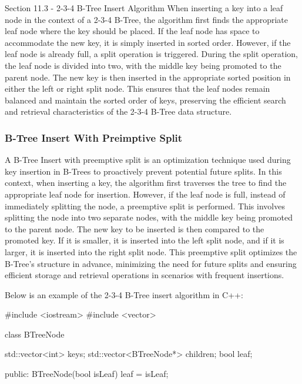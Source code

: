 \begin{notes}{Section 11.3 - 2-3-4 B-Tree Insert Algorithm}
    When inserting a key into a leaf node in the context of a 2-3-4 B-Tree, the algorithm first finds the appropriate leaf node where the key should be placed. If the leaf node has space to accommodate the new key, it is simply inserted in sorted order. However, if the leaf node is already full, a split operation is triggered. During the split operation, 
    the leaf node is divided into two, with the middle key being promoted to the parent node. The new key is then inserted in the appropriate sorted position in either the left or right split node. This ensures that the leaf nodes remain balanced and maintain the sorted order of keys, preserving the efficient search and retrieval characteristics of the 
    2-3-4 B-Tree data structure.
    
    \subsubsection*{B-Tree Insert With Preimptive Split}
    
    A B-Tree Insert with preemptive split is an optimization technique used during key insertion in B-Trees to proactively prevent potential future splits. In this context, when inserting a key, the algorithm first traverses the tree to find the appropriate leaf node for insertion. However, if the leaf node is full, instead of immediately splitting the node, 
    a preemptive split is performed. This involves splitting the node into two separate nodes, with the middle key being promoted to the parent node. The new key to be inserted is then compared to the promoted key. If it is smaller, it is inserted into the left split node, and if it is larger, it is inserted into the right split node. This preemptive split optimizes 
    the B-Tree's structure in advance, minimizing the need for future splits and ensuring efficient storage and retrieval operations in scenarios with frequent insertions.
    
    \begin{highlight}
        Below is an example of the 2-3-4 B-Tree insert algorithm in C++:
    
    \begin{code}[C++]
    #include <iostream>
    #include <vector>
    
    class BTreeNode {
        std::vector<int> keys;
        std::vector<BTreeNode*> children;
        bool leaf;
    
    public:
        BTreeNode(bool isLeaf) {
            leaf = isLeaf;
        }
    
}
\end{code}
\end{highlight}
\end{notes}
